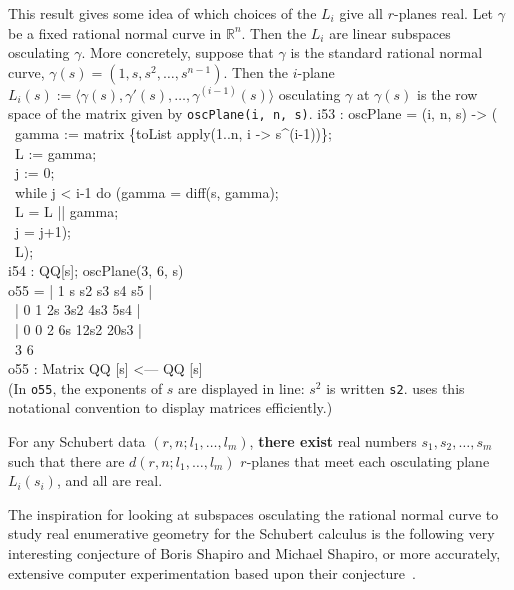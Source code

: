 This result gives some idea of which choices of the $L_i$ give
all $r$-planes real.
Let $\gamma$ be a fixed rational normal curve in ${\mathbb R}^n$.
Then the $L_i$ are linear subspaces osculating $\gamma$.
More concretely, suppose that $\gamma$ is the standard rational normal
curve,
$\gamma(s) = (1, s, s^2, \ldots, s^{n-1})$.
Then the $i$-plane 
$L_i(s):=\langle \gamma(s),\gamma'(s),\ldots,\gamma^{(i-1)}(s)\rangle$ 
osculating $\gamma$ at $\gamma(s)$ is the row space
of the matrix given by {\tt oscPlane(i, n, s)}.
%
\beginOutput
i53 : oscPlane = (i, n, s) -> (\\
\           gamma := matrix \{toList apply(1..n, i -> s^(i-1))\};\\
\           L := gamma;\\
\           j := 0;\\
\           while j < i-1 do (gamma = diff(s, gamma); \\
\                L = L || gamma;\\
\                j = j+1);\\
\           L);\\
\endOutput
%
\beginOutput
i54 : QQ[s]; oscPlane(3, 6, s)\\
\emptyLine
o55 = | 1 s s2 s3  s4   s5   |\\
\      | 0 1 2s 3s2 4s3  5s4  |\\
\      | 0 0 2  6s  12s2 20s3 |\\
\emptyLine
\                   3            6\\
o55 : Matrix QQ [s]  <--- QQ [s]\\
\endOutput
%
(In {\tt o55}, the exponents of $s$ are displayed in line: $s^2$ is written
{\tt s2}.
\Mtwo{} uses this notational convention to display
matrices efficiently.) 


\begin{theorem}[\cite{SO:So99a}]\label{thm:special-reality}
For any Schubert data $(r,n;l_1,\ldots,l_m)$, {\bf there exist} real numbers
$s_1,s_2,\ldots,s_m$ such that there are $d(r,n;l_1,\ldots,l_m)$
$r$-planes that meet each osculating plane $L_i(s_i)$, and all are real.
\end{theorem}

The inspiration for looking at subspaces osculating the rational normal
curve to
study real enumerative geometry for the
Schubert calculus is the following very interesting 
conjecture of Boris Shapiro and Michael
Shapiro, or more accurately,
extensive computer experimentation based upon their
conjecture~\cite{SO:RS98,SO:So_shap-www,SO:So00b,SO:Ver00}.
\medskip


